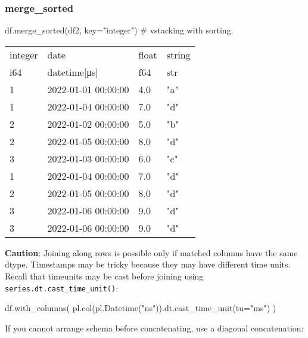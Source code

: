 \documentclass[
  letterpaper,
  DIV=11,
  numbers=noendperiod]{scrartcl}
\newenvironment{Shaded}{\begin{snugshade}}{\end{snugshade}}
\newcommand{\CommentTok}[1]{\textcolor[rgb]{0.37,0.37,0.37}{#1}}
\newcommand{\NormalTok}[1]{\textcolor[rgb]{0.00,0.23,0.31}{#1}}
\newcommand{\OperatorTok}[1]{\textcolor[rgb]{0.37,0.37,0.37}{#1}}
\newcommand{\StringTok}[1]{\textcolor[rgb]{0.13,0.47,0.30}{#1}}
\begin{document}
\hypertarget{merge_sorted}{%
\subsubsection{merge\_sorted}\label{merge_sorted}}

\begin{Shaded}
\begin{Highlighting}[]
\NormalTok{df.merge\_sorted(df2, key}\OperatorTok{=}\StringTok{"integer"}\NormalTok{) }\CommentTok{\# vstacking with sorting.}
\end{Highlighting}
\end{Shaded}

\begin{longtable}[]{@{}llll@{}}
\toprule()
integer & date & float & string \\
i64 & datetime{[}μs{]} & f64 & str \\
\midrule()
\endhead
1 & 2022-01-01 00:00:00 & 4.0 & "a" \\
1 & 2022-01-04 00:00:00 & 7.0 & "d" \\
2 & 2022-01-02 00:00:00 & 5.0 & "b" \\
2 & 2022-01-05 00:00:00 & 8.0 & "d" \\
3 & 2022-01-03 00:00:00 & 6.0 & "c" \\
1 & 2022-01-04 00:00:00 & 7.0 & "d" \\
2 & 2022-01-05 00:00:00 & 8.0 & "d" \\
3 & 2022-01-06 00:00:00 & 9.0 & "d" \\
3 & 2022-01-06 00:00:00 & 9.0 & "d" \\
\bottomrule()
\end{longtable}

\textbf{Caution}: Joining along rows is possible only if matched columns
have the same dtype. Timestamps may be tricky because they may have
different time units. Recall that timeunits may be cast before joining
using \texttt{series.dt.cast\_time\_unit()}:

\begin{Shaded}
\begin{Highlighting}[]
\NormalTok{df.with\_columns(}
\NormalTok{    pl.col(pl.Datetime(}\StringTok{"ns"}\NormalTok{)).dt.cast\_time\_unit(tu}\OperatorTok{=}\StringTok{"ms"}\NormalTok{)}
\NormalTok{)            }
\end{Highlighting}
\end{Shaded}

If you cannot arrange schema before concatenating, use a diagonal
concatenation:
\end{document}

